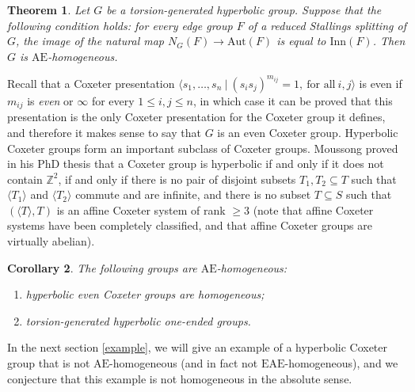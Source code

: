 \documentclass[a4paper, 11pt]{amsart}
\newtheorem{te}{Theorem}[section]
\newtheorem{co}[te]{Corollary}
\theoremstyle{definition}
\theoremstyle{remark}
\renewcommand{\leq}{\leqslant}
\renewcommand{\geq}{\geqslant}
\begin{document}
\begin{te}\label{main_theorem}
Let $G$ be a torsion-generated hyperbolic group. Suppose that the following condition holds: for every edge group $F$ of a reduced Stallings splitting of $G$, the image of the natural map $N_G(F)\rightarrow \mathrm{Aut}(F)$ is equal to $\mathrm{Inn}(F)$. Then $G$ is $\mathrm{AE}$-homogeneous.
\end{te}

Recall that a Coxeter presentation $\langle s_1,\ldots,s_n \ \vert \ (s_is_j)^{m_{ij}}=1, \ \text{for all} \ i,j \rangle$ is even if $m_{ij}$ is \emph{even} or $\infty$ for every $1\leq i,j\leq n$, in which case it can be proved that this presentation is the only Coxeter presentation for the Coxeter group it defines, and therefore it makes sense to say that $G$ is an even Coxeter group. Hyperbolic Coxeter groups form an important subclass of Coxeter groups. Moussong proved in his PhD thesis that a Coxeter group is hyperbolic if and only if it does not contain $\mathbb{Z}^2$, if and only if there is no pair of disjoint subsets $T_1,T_2\subseteq T$ such that $\langle T_1\rangle$ and $\langle T_2\rangle$ commute and are infinite, and there is no subset $T\subseteq S$ such that $(\langle T\rangle,T)$ is an affine Coxeter system of rank $\geq 3$ (note that affine Coxeter systems have been completely classified, and that affine Coxeter groups are virtually abelian).


\begin{co}\label{corollary}
The following groups are $\mathrm{AE}$-homogeneous:
\begin{enumerate}[(1)]
    \item[$\bullet$]  hyperbolic even Coxeter groups are homogeneous;
    \item[$\bullet$] torsion-generated hyperbolic one-ended groups.
\end{enumerate}
\end{co}

In the next section \ref{example}, we will give an example of a hyperbolic Coxeter group that is not $\mathrm{AE}$-homogeneous (and in fact not $\mathrm{EAE}$-homogeneous), and we conjecture that this example is not homogeneous in the absolute sense.
\end{document}
